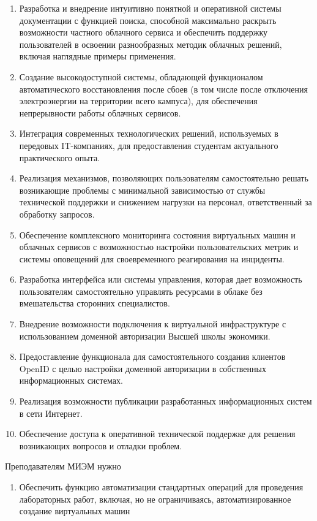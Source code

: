 \documentclass[14pt, a4paper]{extarticle}
\begin{document}
\begin{enumerate}

\item Разработка и внедрение интуитивно понятной и оперативной системы документации с функцией поиска, способной максимально раскрыть возможности частного облачного сервиса и обеспечить поддержку пользователей в освоении разнообразных методик облачных решений, включая наглядные примеры применения.
\item Создание высокодоступной системы, обладающей функционалом автоматического восстановления после сбоев (в том числе после отключения электроэнергии на территории всего кампуса), для обеспечения непрерывности работы облачных сервисов.
\item Интеграция современных технологических решений, используемых в передовых IT-компаниях, для предоставления студентам актуального практического опыта.
\item Реализация механизмов, позволяющих пользователям самостоятельно решать возникающие проблемы с минимальной зависимостью от службы технической поддержки и снижением нагрузки на персонал, ответственный за обработку запросов.
\item Обеспечение комплексного мониторинга состояния виртуальных машин и облачных сервисов с возможностью настройки пользовательских метрик и системы оповещений для своевременного реагирования на инциденты.
\item Разработка интерфейса или системы управления, которая дает возможность пользователям самостоятельно управлять ресурсами в облаке без вмешательства сторонних специалистов.
\item Внедрение возможности подключения к виртуальной инфраструктуре с использованием доменной авторизации Высшей школы экономики.
\item Предоставление функционала для самостоятельного создания клиентов OpenID с целью настройки доменной авторизации в собственных информационных системах.
\item Реализация возможности публикации разработанных информационных систем в сети Интернет.
\item Обеспечение доступа к оперативной технической поддержке для решения возникающих вопросов и отладки проблем.

\end{enumerate}

Преподавателям МИЭМ нужно

\begin{enumerate}
\item Обеспечить функцию автоматизации стандартных операций для проведения лабораторных работ, включая, но не ограничиваясь, автоматизированное создание виртуальных машин
\end{enumerate}
\end{document}
